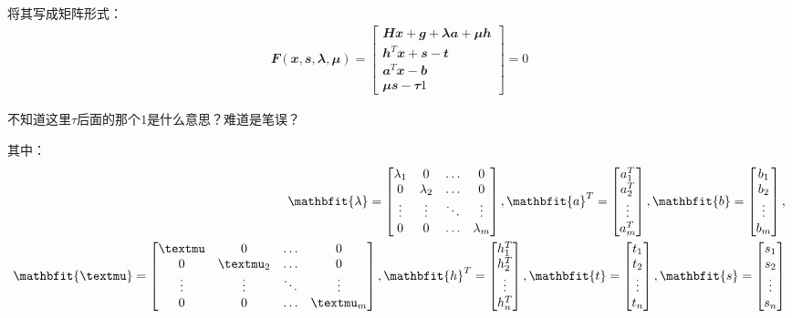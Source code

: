 将其写成矩阵形式：
\begin{align}
  \mathbfit{F}(\mathbfit{x},\mathbfit{s},\mathbfit{\lambda},\mathbfit{\mu})=\begin{bmatrix}
    \mathbfit{H}\mathbfit{x}+\mathbfit{g}+\mathbfit{\lambda}\mathbfit{a}+\mathbfit{\mu}\mathbfit{h}\\
    \mathbfit{h}^T\mathbfit{x}+\mathbfit{s}-\mathbfit{t}\\
    \mathbfit{a}^T\mathbfit{x}-\mathbfit{b}\\
    \mathbfit{\mu}\mathbfit{s}-\mathbfit{\tau}\mathbfit{1}
  \end{bmatrix} = 0
\end{align}
\begin{note}
  不知道这里$\tau$后面的那个$1$是什么意思？难道是笔误？
\end{note}
其中：
\begin{align}
  \mathbfit{\lambda}=\begin{bmatrix}
    \lambda_1 & 0 & \dots & 0\\
    0 & \lambda_2 & \dots & 0\\
    \vdots & \vdots &\ddots & \vdots\\
    0 & 0 &\dots & \lambda_m
  \end{bmatrix}, \quad
  \mathbfit{a}^T=\begin{bmatrix}
    a_1^T \\ a_2^T \\ \vdots \\ a_m^T
  \end{bmatrix}, \quad
  \mathbfit{b}=\begin{bmatrix}
    b_1 \\ b_2 \\ \vdots \\ b_m 
  \end{bmatrix}, \quad \notag\\
  \mathbfit{\mu}=\begin{bmatrix}
    \mu & 0 & \dots & 0\\
    0 & \mu_2 & \dots & 0\\
    \vdots & \vdots &\ddots & \vdots\\
    0 & 0 &\dots & \mu_m
  \end{bmatrix}, \quad
  \mathbfit{h}^T=\begin{bmatrix}
    h_1^T \\ h_2^T \\ \vdots \\ h_n^T
  \end{bmatrix}, \quad
  \mathbfit{t}=\begin{bmatrix}
    t_1 \\ t_2 \\ \vdots \\ t_n
  \end{bmatrix}, \quad
  \mathbfit{s}=\begin{bmatrix}
    s_1 \\ s_2 \\ \vdots \\ s_n
  \end{bmatrix}
\end{align}

